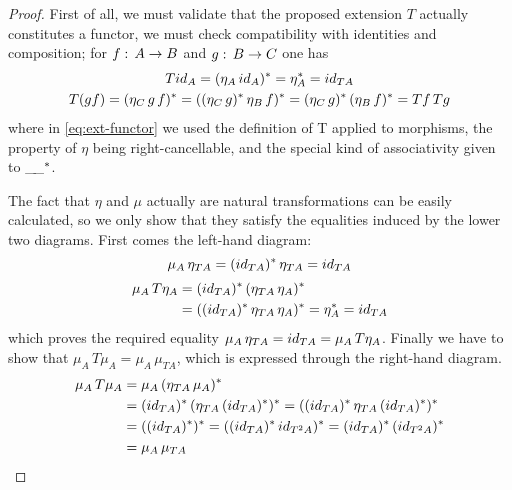 \begin{proof}
First of all, we must validate that the proposed extension $T$ actually
constitutes a functor, \IE we must check compatibility with identities and
composition; for $f :\, A \to B$ and $g :\, B \to C$ one has
\begin{gather}
  T {id}_A = (\eta_A\, {id}_A)^* = \eta_A^* = {id}_{T A} \\
  \label{eq:ext-functor}
  T (g f) = (\eta_C\, g\, f)^* = ((\eta_C\, g)^*\, \eta_B\, f)^* = (\eta_C\, g)^*\, (\eta_B\,
  f)^* = T f\, T g
\end{gather}
where in \eqref{eq:ext-functor} we used the definition of T applied to
morphisms, the property of $\eta$ being right-cancellable, and the special kind
of associativity given to $\_\!\_^*$.

The fact that $\eta$ and $\mu$ actually are natural transformations can be
easily calculated, so we only show that they satisfy the equalities induced by
the lower two diagrams. First comes the left-hand diagram:
\begin{equation}
    \mu_A\, \eta_{T A} = ({id}_{TA})^*\, \eta_{T A} = {id}_{T A}
\end{equation} 
\begin{equation}
  \begin{split}
    \mu_A\, T\eta_A &= ({id}_{T A})^*\, (\eta_{T A}\, \eta_A)^*\\
              &= (({id}_{T A})^*\, \eta_{T A}\, \eta_A)^* = \eta_A^* = {id}_{T A}
  \end{split}
\end{equation}
which proves the required equality $\mu_A\, \eta_{T A} = {id}_{T A} = \mu_A\,
T\eta_A$. Finally we have to show that $\mu_A\, T\mu_A = \mu_A\, \mu_{T A}$, which is
expressed through the right-hand diagram.
\begin{equation}
  \begin{split}
    \mu_A\, T\mu_A &= \mu_A\, (\eta_{T A}\, \mu_A)^*\\
              &= ({id}_{T A})^*\, (\eta_{T A}\, ({id}_{T A})^*)^*
              = (({id}_{T A})^*\, \eta_{T A}\, ({id}_{T A})^*)^*\\
              &= (({id}_{T A})^*)^*
              = (({id}_{T A})^*\, {id}_{T^2A})^*
              = ({id}_{T A})^*\, ({id}_{T^2A})^*\\
              &= \mu_A\, \mu_{T A}
  \end{split}
\end{equation}
\end{proof}




